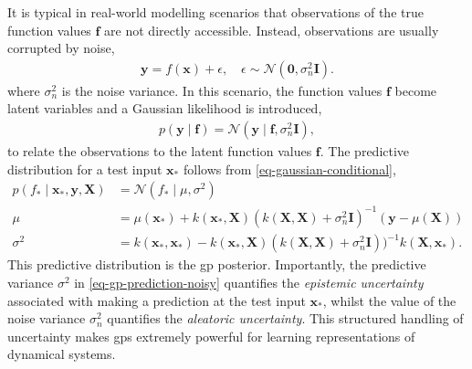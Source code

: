 \documentclass{mimosis-class/mimosis}
\numberwithin{equation}{chapter}
\newcommand{\f}{\ensuremath{\mathbf{f}}}
\begin{document}
It is typical in real-world modelling scenarios that observations of the true function values \(\f\)
are not directly accessible.
Instead, observations are usually corrupted by noise,
\begin{align} \label{eq-gp-noisy}
\mathbf{y} = f(\mathbf{x}) + \epsilon, \quad \epsilon \sim \mathcal{N}\left( \mathbf{0}, \sigma^2_{n} \mathbf{I} \right).
\end{align}
where \(\sigma^2_n\) is the noise variance.
In this scenario, the function values \(\f\) become latent variables and a Gaussian likelihood
is introduced,
\begin{align} \label{eq-gp-likelihood}
p(\mathbf{y} \mid \f) = \mathcal{N}\left( \mathbf{y} \mid \f, \sigma^2_{n} \mathbf{I} \right),
\end{align}
to relate the observations to the latent function values \(\f\).
The predictive distribution for a test input \(\mathbf{x}_*\) follows from \cref{eq-gaussian-conditional},
\begin{align} \label{eq-gp-prediction-noisy}
p(f_{*} \mid \mathbf{x}_*, \mathbf{y}, \mathbf{X}) &= \mathcal{N}(f_* \mid \mu, \sigma^2)  \\
\mu &= \mu(\mathbf{x}_*) + k(\mathbf{x}_*, \mathbf{X})
\left(k(\mathbf{X}, \mathbf{X}) + \sigma^2_n \mathbf{I} \right)^{-1} (\mathbf{y} - \mu(\mathbf{X})) \nonumber\\
\sigma^2 &= k(\mathbf{x}_*, \mathbf{x}_*) -
k(\mathbf{x}_*, \mathbf{X})
\left( k(\mathbf{X}, \mathbf{X}) + \sigma^2_n \mathbf{I} \right))^{-1}
k(\mathbf{X}, \mathbf{x}_*). \nonumber
\end{align}
This predictive distribution is the \acrshort{gp} posterior.
Importantly, the predictive variance \(\sigma^2\) in \cref{eq-gp-prediction-noisy} quantifies the \emph{epistemic uncertainty}
associated with making a prediction at the test input \(\mathbf{x}_*\), whilst the value of the noise variance
\(\sigma_n^2\) quantifies the \emph{aleatoric uncertainty}.
This structured handling of uncertainty makes \acrshort{gps} extremely powerful for learning representations
of dynamical systems.
\end{document}
